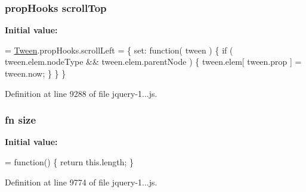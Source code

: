 \hypertarget{obj_2_release_2_package_2_package_tmp_2_scripts_2jquery-1_810_82_8js_a57beb1f611d6c8b84919b0f7d9e0e890}{}
\subsubsection[{scroll\+Top}]{ {\bf prop\+Hooks} scroll\+Top}\label{obj_2_release_2_package_2_package_tmp_2_scripts_2jquery-1_810_82_8js_a57beb1f611d6c8b84919b0f7d9e0e890}
{\bfseries Initial value\+:}
\begin{DoxyCode}
= \hyperlink{obj_2_release_2_package_2_package_tmp_2_scripts_2jquery-1_810_82_8js_a91e55267cc469e865a6a7c6cfc51c7b1}{Tween}.propHooks.scrollLeft = \{
    set: \textcolor{keyword}{function}( tween ) \{
        \textcolor{keywordflow}{if} ( tween.elem.nodeType && tween.elem.parentNode ) \{
            tween.elem[ tween.prop ] = tween.now;
        \}
    \}
\}
\end{DoxyCode}


Definition at line 9288 of file jquery-\/1...\+js.

\hypertarget{obj_2_release_2_package_2_package_tmp_2_scripts_2jquery-1_810_82_8js_afa6806c6ee5e63d5177f1dcc082ba6bc}{}
\subsubsection[{size}]{ {\bf fn} size}\label{obj_2_release_2_package_2_package_tmp_2_scripts_2jquery-1_810_82_8js_afa6806c6ee5e63d5177f1dcc082ba6bc}
{\bfseries Initial value\+:}
\begin{DoxyCode}
= \textcolor{keyword}{function}() \{
    \textcolor{keywordflow}{return} this.length;
\}
\end{DoxyCode}


Definition at line 9774 of file jquery-\/1...\+js.

